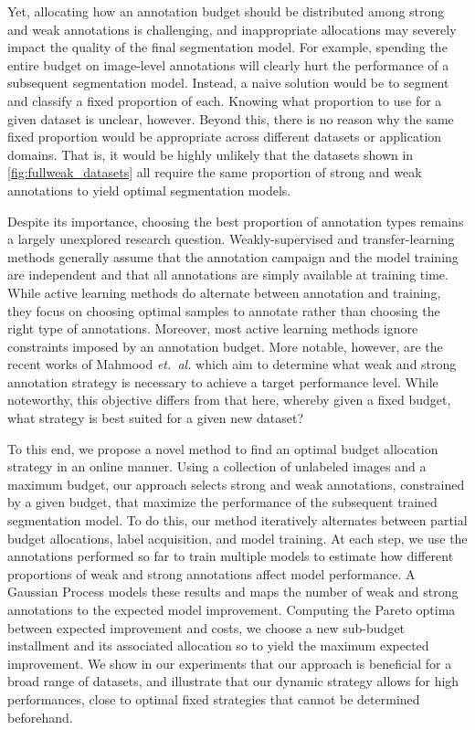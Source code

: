 Yet, allocating how an annotation budget should be distributed among strong and weak annotations is challenging, and inappropriate allocations may severely impact the quality of the final segmentation model. For example, spending the entire budget on image-level annotations will clearly hurt the performance of a subsequent segmentation model. Instead, a naive solution would be to segment and classify a fixed proportion of each. Knowing what proportion to use for a given dataset is unclear, however. Beyond this, there is no reason why the same fixed proportion would be appropriate across different datasets or application domains. That is, it would be highly unlikely that the datasets shown in \cref{fig:fullweak_datasets} all require the same proportion of strong and weak annotations to yield optimal segmentation models.

Despite its importance, choosing the best proportion of annotation types remains a largely unexplored research question. Weakly-supervised and transfer-learning methods generally assume that the annotation campaign and the model training are independent and that all annotations are simply available at training time. While active learning methods do alternate between annotation and training, they focus on choosing optimal samples to annotate rather than choosing the right type of annotations. Moreover, most active learning methods ignore constraints imposed by an annotation budget. More notable, however, are the recent works of Mahmood {\it et.~al.} which aim to determine what weak and strong annotation strategy is necessary to achieve a target performance level. While noteworthy, this objective differs from that here, whereby given a fixed budget, what strategy is best suited for a given new dataset?

To this end, we propose a novel method to find an optimal budget allocation strategy in an online manner. Using a collection of unlabeled images and a maximum budget, our approach selects strong and weak annotations, constrained by a given budget, that maximize the performance of the subsequent trained segmentation model. To do this, our method iteratively alternates between partial budget allocations, label acquisition, and model training. At each step, we use the annotations performed so far to train multiple models to estimate how different proportions of weak and strong annotations affect model performance. A Gaussian Process models these results and maps the number of weak and strong annotations to the expected model improvement. Computing the Pareto optima between expected improvement and costs, we choose a new sub-budget installment and its associated allocation so to yield the maximum expected improvement. We show in our experiments that our approach is beneficial for a broad range of datasets, and illustrate that our dynamic strategy allows for high performances, close to optimal fixed strategies that cannot be determined beforehand.
